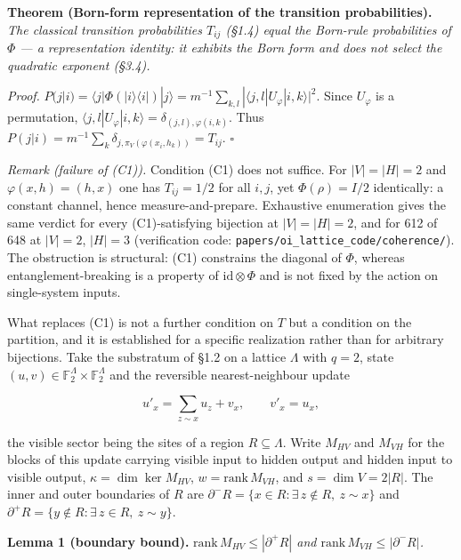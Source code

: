 \documentclass[
]{article}
\begin{document}
\textbf{Theorem (Born-form representation of the transition
probabilities).} \emph{The classical transition probabilities \(T_{ij}\)
(§1.4) equal the Born-rule probabilities of \(\Phi\) --- a
representation identity: it exhibits the Born form and does not select
the quadratic exponent (§3.4).}

\emph{Proof.}
\(P(j|i) = \langle j|\Phi(|i\rangle\langle i|)|j\rangle = m^{-1}\sum_{k,l} |\langle j,l|U_\varphi|i,k\rangle|^2\).
Since \(U_\varphi\) is a permutation,
\(\langle j,l|U_\varphi|i,k\rangle = \delta_{(j,l),\varphi(i,k)}\). Thus
\(P(j|i) = m^{-1}\sum_k \delta_{j,\pi_V(\varphi(x_i,h_k))} = T_{ij}\).
\(\square\)

\emph{Remark (failure of (C1)).} Condition (C1) does not suffice. For
\(|V| = |H| = 2\) and \(\varphi(x,h) = (h,x)\) one has \(T_{ij} = 1/2\)
for all \(i,j\), yet \(\Phi(\rho) = I/2\) identically: a constant
channel, hence measure-and-prepare. Exhaustive enumeration gives the
same verdict for every (C1)-satisfying bijection at \(|V| = |H| = 2\),
and for 612 of 648 at \(|V| = 2\), \(|H| = 3\) (verification code:
\texttt{papers/oi\_lattice\_code/coherence/}). The obstruction is
structural: (C1) constrains the diagonal of \(\Phi\), whereas
entanglement-breaking is a property of \(\mathrm{id} \otimes \Phi\) and
is not fixed by the action on single-system inputs.

What replaces (C1) is not a further condition on \(T\) but a condition
on the partition, and it is established for a specific realization
rather than for arbitrary bijections. Take the substratum of §1.2 on a
lattice \(\Lambda\) with \(q = 2\), state
\((u,v) \in \mathbb{F}_2^{\Lambda} \times \mathbb{F}_2^{\Lambda}\) and
the reversible nearest-neighbour update

\[u'_x = \sum_{z \sim x} u_z + v_x, \qquad v'_x = u_x ,\]

the visible sector being the sites of a region \(R \subseteq \Lambda\).
Write \(M_{HV}\) and \(M_{VH}\) for the blocks of this update carrying
visible input to hidden output and hidden input to visible output,
\(\kappa = \dim \ker M_{HV}\), \(w = \mathrm{rank}\, M_{VH}\), and
\(s = \dim V = 2|R|\). The inner and outer boundaries of \(R\) are
\(\partial^{-}R = \{x \in R : \exists\, z \notin R,\ z \sim x\}\) and
\(\partial^{+}R = \{y \notin R : \exists\, z \in R,\ z \sim y\}\).

\textbf{Lemma 1 (boundary bound).}
\emph{\(\mathrm{rank}\, M_{HV} \leq |\partial^{+}R|\) and
\(\mathrm{rank}\, M_{VH} \leq |\partial^{-}R|\).}
\end{document}

